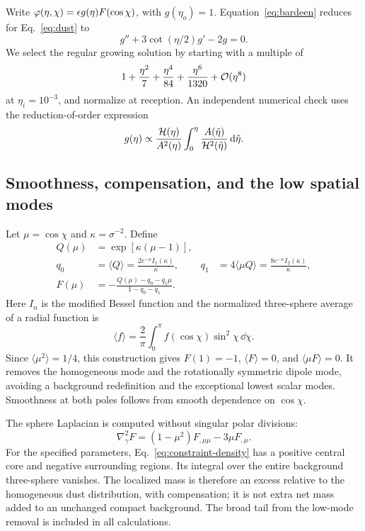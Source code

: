 Write $\varphi(\eta,\chi)=\epsilon g(\eta)F(\cos\chi)$, with $g(\eta_o)=1$.
Equation~\eqref{eq:bardeen} reduces for Eq.~\eqref{eq:dust} to
\begin{equation}\label{eq:growth}
 g''+3\cot(\eta/2)g'-2g=0.
\end{equation}
We select the regular growing solution by starting with a multiple of
\begin{equation}\label{eq:growth-series}
 1+\frac{\eta^2}{7}+\frac{\eta^4}{84}+\frac{\eta^6}{1320}
 +\mathcal O(\eta^8)
\end{equation}
at $\eta_i=10^{-3}$, and normalize at reception. An independent numerical
check uses the reduction-of-order expression
\begin{equation}
 g(\eta)\propto \frac{\mathcal H(\eta)}{A^2(\eta)}
 \int_0^\eta\frac{A(\tilde\eta)}{\mathcal H^2(\tilde\eta)}\,\mathrm{d}\tilde\eta.
\end{equation}

\subsection{Smoothness, compensation, and the low spatial modes}
Let $\mu=\cos\chi$ and $\kappa=\sigma^{-2}$. Define
\begin{align}
 Q(\mu)&=\exp[\kappa(\mu-1)],\\
 q_0&=\langle Q\rangle=\frac{2e^{-\kappa}I_1(\kappa)}{\kappa},
 &q_1&=4\langle\mu Q\rangle=\frac{8e^{-\kappa}I_2(\kappa)}{\kappa},\\
 F(\mu)&=-\frac{Q(\mu)-q_0-q_1\mu}{1-q_0-q_1}.
 \label{eq:profile}
\end{align}
Here $I_n$ is the modified Bessel function and the normalized three-sphere
average of a radial function is
\begin{equation}
 \langle f\rangle=\frac{2}{\pi}\int_0^\pi f(\cos\chi)\sin^2\chi\,\dd\chi.
\end{equation}
Since $\langle\mu^2\rangle=1/4$, this construction gives
$F(1)=-1$, $\langle F\rangle=0$, and $\langle\mu F\rangle=0$.
It removes the homogeneous mode and the rotationally symmetric dipole
mode, avoiding a background redefinition and the exceptional lowest
scalar modes. Smoothness at both poles follows from smooth dependence
on $\cos\chi$.

The sphere Laplacian is computed without singular polar divisions:
\begin{equation}\label{eq:laplace}
 \nabla_\gamma^2F=(1-\mu^2)F_{,\mu\mu}-3\mu F_{,\mu}.
\end{equation}
For the specified parameters, Eq.~\eqref{eq:constraint-density} has a
positive central core and negative surrounding regions. Its integral
over the entire background three-sphere vanishes. The localized mass
is therefore an excess relative to the homogeneous dust distribution,
with compensation; it is not extra net mass added to an unchanged
compact background. The broad tail from the low-mode removal is included
in all calculations.

